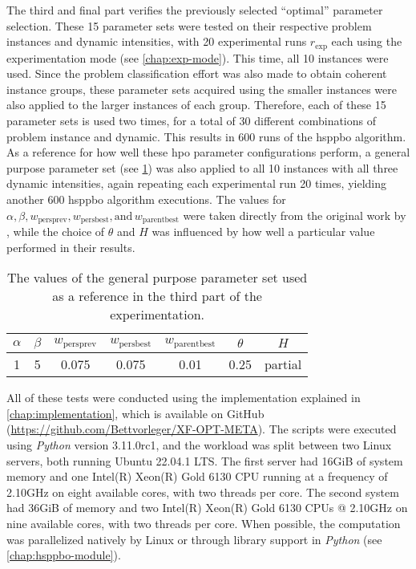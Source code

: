 The third and final part verifies the previously selected \enquote{optimal} parameter selection. These 15 parameter sets were tested on their respective problem instances and dynamic intensities, with 20 experimental runs $r_\text{exp}$ each using the experimentation mode (see \cref{chap:exp-mode}). This time, all 10 instances were used. Since the problem classification effort was also made to obtain coherent instance groups, these parameter sets acquired using the smaller instances were also applied to the larger instances of each group. Therefore, each of these 15 parameter sets is used two times, for a total of 30 different combinations of problem instance and dynamic. This results in 600 runs of the \gls{hsppbo} algorithm.
As a reference for how well these \gls{hpo} parameter configurations perform, a general purpose parameter set (see \cref{tab:part3-gen-params}) was also applied to all 10 instances with all three dynamic intensities, again repeating each experimental run 20 times, yielding another 600 \gls{hsppbo} algorithm executions.
The values for $\alpha, \beta, w_{\text{persprev}}, w_{\text{persbest}}, \text{and} \, w_{\text{parentbest}}$ were taken directly from the original work by \citet{kupfer2021hierarchical}, while the choice of $\theta$ and $H$ was influenced by how well a particular value performed in their results.
\begin{table}
	\centering
	\caption{The values of the general purpose parameter set used as a reference in the third part of the experimentation.}
	\label{tab:part3-gen-params}
	
	\begin{tabular}{c c c c c c c}
		\hline
		$\alpha$ & $\beta$ & $w_{\text{persprev}}$ & $w_{\text{persbest}}$& $w_{\text{parentbest}}$ & $\theta$ & $H$ \\
		\hline
		1 & 5 & 0.075 & 0.075 & 0.01 & 0.25 & partial \\ \hline
	\end{tabular}
\end{table}

All of these tests were conducted using the implementation explained in \cref{chap:implementation}, which is available on GitHub (\url{https://github.com/Bettvorleger/XF-OPT-META}). The scripts were executed using \textit{Python} version 3.11.0rc1, and the workload was split between two Linux servers, both running Ubuntu 22.04.1 LTS. The first server had 16GiB of system memory and one Intel(R) Xeon(R) Gold 6130 CPU running at a frequency of 2.10GHz on eight available cores, with two threads per core. The second system had 36GiB of memory and two Intel(R) Xeon(R) Gold 6130 CPUs @ 2.10GHz on nine available cores, with two threads per core. When possible, the computation was parallelized natively by Linux or through library support in \textit{Python} (see \cref{chap:hsppbo-module}).
 
